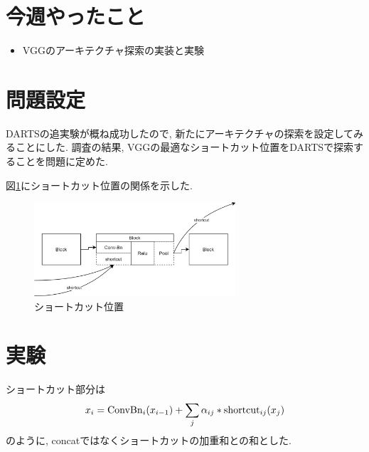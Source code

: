 \documentclass[twocolumn]{jarticle}     %
\begin{document}


\section{今週やったこと}
\begin{itemize}
	\item VGGのアーキテクチャ探索の実装と実験
\end{itemize}

\section{問題設定}
DARTSの追実験が概ね成功したので, 新たにアーキテクチャの探索を設定してみることにした.
調査の結果, VGGの最適なショートカット位置をDARTSで探索することを問題に定めた.

図\ref{fig:connect}にショートカット位置の関係を示した.


\begin{figure}[tb]
	\begin{center}
		\includegraphics[clip,width=7.5cm]{connect.png}
		\caption{ショートカット位置}
		\label{fig:connect}
	\end{center}
\end{figure}

\section{実験}

ショートカット部分は
\begin{equation}
  \label{equ:cut}
  x_i = {\rm ConvBn}_{i}(x_{i-1}) + \sum_j \alpha_{ij} * {\rm shortcut}_{ij} (x_j)
\end{equation}
のように, concatではなくショートカットの加重和との和とした.
\end{document}
